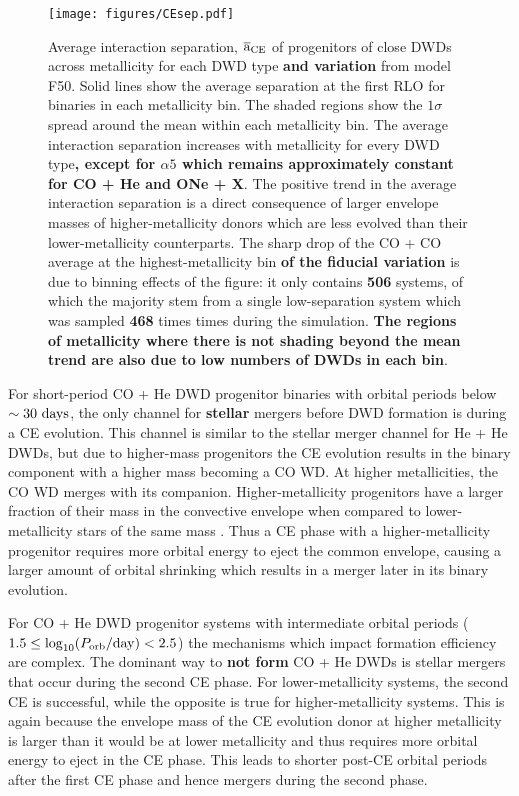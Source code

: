 \documentclass[twocolumn, linenumbers]{aastex631}
\begin{document}
\begin{figure*}
	\texttt{[image: figures/CEsep.pdf]}
    \caption{Average interaction separation, $\overline{\mathrm{a}}_{\rm{CE}}$ of progenitors of close DWDs across metallicity for each DWD type \textbf{and variation} from model F50. Solid lines show the average separation at the first RLO for binaries in each metallicity bin. The shaded regions show the $1\sigma$ spread around the mean within each metallicity bin. The average interaction separation increases with metallicity for every DWD type\textbf{, except for $\alpha5$ which remains approximately constant for CO + He and ONe + X}. The positive trend in the average interaction separation is a direct consequence of larger envelope masses of higher-metallicity donors which are less evolved than their lower-metallicity counterparts. The sharp drop of the CO + CO average at the highest-metallicity bin \textbf{of the fiducial variation} is due to binning effects of the figure: it only contains \textbf{506} systems, of which the majority stem from a single low-separation system which was sampled \textbf{468} times times during the simulation. \textbf{The regions of metallicity where there is not shading beyond the mean trend are also due to low numbers of DWDs in each bin}.} 
    \label{fig:CEsep}
\end{figure*}


For short-period CO + He DWD progenitor binaries with orbital periods below $\sim30~\rm{days}$, the only channel for \textbf{stellar} mergers before DWD formation is during a CE evolution. This channel is similar to the stellar merger channel for He + He DWDs, but due to higher-mass progenitors the CE evolution results in the binary component with a higher mass becoming a CO WD. At higher metallicities, the CO WD merges with its companion. Higher-metallicity progenitors have a larger fraction of their mass in the convective envelope when compared to lower-metallicity stars of the same mass \citep{Amard2019, Amard2020}. Thus a CE phase with a higher-metallicity progenitor requires more orbital energy to eject the common envelope, causing a larger amount of orbital shrinking which results in a merger later in its binary evolution.

For CO + He DWD progenitor systems with intermediate orbital periods ($1.5\leq \log_{10}(P_{\rm{orb}}/\rm{day})< 2.5$) the mechanisms which impact formation efficiency are complex. The dominant way to \textbf{not form} CO + He DWDs is stellar mergers that occur during the second CE phase. For lower-metallicity systems, the second CE is successful, while the opposite is true for higher-metallicity systems. This is again because the envelope mass of the CE evolution donor at higher metallicity is larger than it would be at lower metallicity and thus requires more orbital energy to eject in the CE phase. This leads to shorter post-CE orbital periods after the first CE phase and hence mergers during the second phase.
\end{document}
